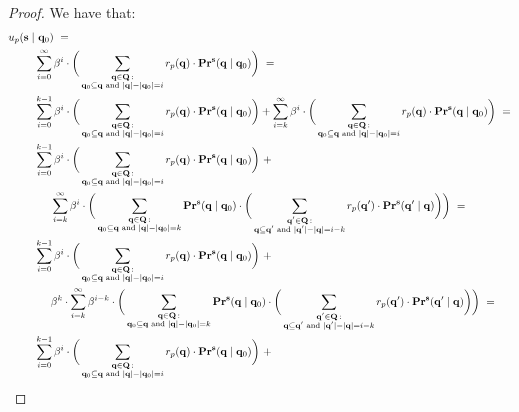 \begin{proof} We have that:
\begin{align*}
u_p(\bs \mid & \ \bq_0)  \ =  \\
&\sum_{i=0}^{\infty}\beta^{i} \cdot  \bigg(\sum_{\substack{\bq \in \bQ \,: \\ \bq_0 \subseteq \bq \text{ {\rm and} } |\bq| - |\bq_0| = i}} r_p(\bq) \cdot 
\pr^{\bs}(\bq \mid \bq_0)\bigg) \ =\\
&\sum_{i=0}^{k-1} \beta^i \cdot \bigg(\sum_{\substack{\bq \in \bQ \,: \\ \bq_0 \subseteq \bq \text{ {\rm and} } |\bq| - |\bq_0| = i}}
r_p(\bq) \cdot \pr^{\bs}(\bq \mid \bq_0)\bigg) + 
\sum_{i=k}^{\infty}\beta^{i} \cdot  \bigg(\sum_{\substack{\bq \in \bQ \,: \\ \bq_0 \subseteq \bq \text{ {\rm and} } |\bq| - |\bq_0| = i}} r_p(\bq) \cdot 
\pr^{\bs}(\bq \mid \bq_0)\bigg)\ = \\
&  \sum_{i=0}^{k-1} \beta^i \cdot \bigg(\sum_{\substack{\bq \in \bQ \,: \\ \bq_0 \subseteq \bq \text{ {\rm and} } |\bq| - |\bq_0| = i}} r_p(\bq) \cdot \pr^{\bs}(\bq \mid \bq_0)\bigg) \ + \\
& \hspace{15pt} \sum_{i=k}^{\infty}\beta^{i} \cdot  \bigg(
\sum_{\substack{\bq \in \bQ \,: \\ \bq_0 \subseteq \bq \text{ {\rm and} } |\bq| - |\bq_0| = k}} \pr^{\bs}(\bq \mid \bq_0) \cdot
\bigg(\sum_{\substack{\bq' \in \bQ \,: \\ \bq \subseteq \bq' \text{ {\rm and} } |\bq'| - |\bq| = i-k}} r_p(\bq') \cdot 
\pr^{\bs}(\bq' \mid \bq)\bigg)\bigg)\ = \\
& \sum_{i=0}^{k-1} \beta^i \cdot \bigg(\sum_{\substack{\bq \in \bQ \,: \\ \bq_0 \subseteq \bq \text{ {\rm and} } |\bq| - |\bq_0| = i}} r_p(\bq) \cdot \pr^{\bs}(\bq \mid \bq_0)\bigg) \ + \\
& \hspace{15pt}
\beta^k \cdot \sum_{i=k}^{\infty}\beta^{i-k} \cdot  \bigg(
\sum_{\substack{\bq \in \bQ \,: \\ \bq_0 \subseteq \bq \text{ {\rm and} } |\bq| - |\bq_0| = k}} \pr^{\bs}(\bq \mid \bq_0) \cdot
\bigg(\sum_{\substack{\bq' \in \bQ \,: \\ \bq \subseteq \bq' \text{ {\rm and} } |\bq'| - |\bq| = i-k}} r_p(\bq') \cdot 
\pr^{\bs}(\bq' \mid \bq)\bigg)\bigg)\ = \\
& \sum_{i=0}^{k-1} \beta^i \cdot \bigg(\sum_{\substack{\bq \in \bQ \,: \\ \bq_0 \subseteq \bq \text{ {\rm and} } |\bq| - |\bq_0| = i}} r_p(\bq) \cdot \pr^{\bs}(\bq \mid \bq_0)\bigg) \ + \\

\end{align*}
\end{proof}
